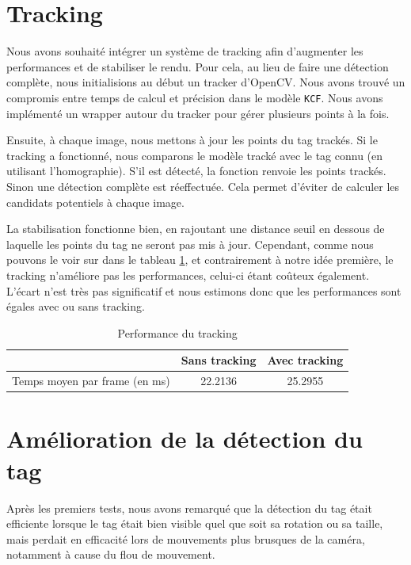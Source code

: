     \section{Tracking}
        Nous avons souhaité intégrer un système de tracking afin d'augmenter les performances et de stabiliser le rendu. Pour cela, au lieu de faire une détection complète, nous initialisions au début un tracker d'OpenCV. Nous avons trouvé un compromis entre temps de calcul et précision dans le modèle \verb|KCF|. Nous avons implémenté un wrapper autour du tracker pour gérer plusieurs points à la fois. 

        Ensuite, à chaque image, nous mettons à jour les points du tag trackés. Si le tracking a fonctionné, nous comparons le modèle tracké avec le tag connu (en utilisant l'homographie). S'il est détecté, la fonction renvoie les points trackés. Sinon une détection complète est réeffectuée. Cela permet d'éviter de calculer les candidats potentiels à chaque image.

        La stabilisation fonctionne bien, en rajoutant une distance seuil en dessous de laquelle les points du tag ne seront pas mis à jour. Cependant, comme nous pouvons le voir sur dans le tableau \ref{table:tracking}, et contrairement à notre idée première, le tracking n'améliore pas les performances, celui-ci étant coûteux également. L'écart n'est très pas significatif et nous estimons donc que les performances sont égales avec ou sans tracking.

        \begin{table}[!h]
            \begin{center}
                \begin{tabular}{c|c|c}
                 & Sans tracking & Avec tracking \\ \hline
                Temps moyen par frame (en ms) & 22.2136 & 25.2955 \\ 
                \end{tabular}
            \end{center}
            \caption{Performance du tracking}
            \label{table:tracking}
        \end{table}
    
    \section{Amélioration de la détection du tag}

    Après les premiers tests, nous avons remarqué que la détection du tag était efficiente lorsque le tag était bien visible quel que soit sa rotation ou sa taille, mais perdait en efficacité lors de mouvements plus brusques de la caméra, notamment à cause du flou de mouvement.

